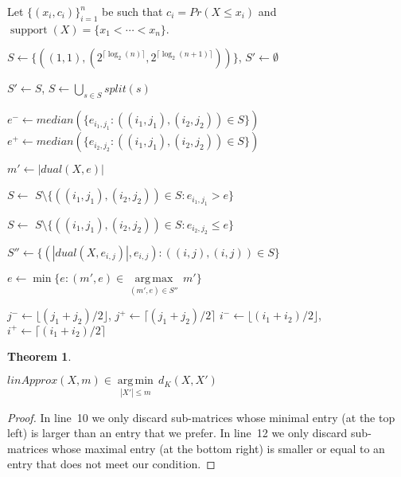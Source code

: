 \documentclass[letterpaper]{article} %
\newtheorem{theorem}[thm]{Theorem}
\DeclareMathOperator{\supp}{support}
\begin{document}
\begin{algorithm}
		\DontPrintSemicolon
		Let $\{(x_i, c_i)\}_{i=1}^n$ be such that $c_i=Pr(X \leq x_i)$ and $\supp(X)=\{x_1 < \cdots < x_n\}$.\;

		$S \gets  \{ ((1, 1),
		( 2^{\lceil \log_2(n) \rceil},2^{\lceil \log_2(n+1) \rceil})) \}$, $S' \gets \emptyset$\;
		
		
		{
			$S' \gets S$,
			$S \gets  \bigcup_{s \in S} split(s)$\;
			
			$e^- {\gets} median(\{ e_{i_1,j_1} \colon ((i_1,j_1),(i_2,j_2)) \in S \}) $\;		
			$e^+ {\gets} median(\{ e_{i_2,j_2} \colon ((i_1,j_1),(i_2,j_2)) \in S \}) $\;			

			 {
				$m' \gets |dual(X,e)|$\;
	
				 {
					$S \gets$ $S \setminus \{ ((i_1,j_1),(i_2,j_2)) \in S \colon e_{i_1,j_1} > e \}$ \;
				}
			
				\Else %
				{
					$S \gets$ $S \setminus \{ ((i_1,j_1),(i_2,j_2)) \in S \colon e_{i_2,j_2} \leq e \}$ \;
				}
			}
		}
	
		$S'' \gets \{(|dual(X,e_{i,j})|,e_{i,j}) \colon ((i,j),(i,j)) \in S\}$\;	
	
		$e \gets \min\{e\colon (m',e) \in \underset{(m',e)\in S''}{\operatorname{arg\,max}}\, m'\}$\;

		\caption{$linApprox(X,m)$}   
		\label{alg:linear}
	\end{algorithm}
{
	\begin{function}
		\DontPrintSemicolon
		
		$j^- \gets \lfloor (j_1+j_2)/2 \rfloor$,
		$j^+ \gets \lceil (j_1+j_2)/2 \rceil$\;
		$i^- \gets \lfloor (i_1+i_2)/2 \rfloor$,
		$i^+ \gets \lceil (i_1+i_2)/2 \rceil$\;

		
		\caption{{$split(((i_1,j_1),(i_2,j_2)))$}()}
		\label{proc:split}
	\end{function}
}	
	
	
\begin{theorem}\label{the:correctnessLinear}
	   
   $linApprox(X,m) {\in} \underset{|X'|\leq m}{\operatorname{arg\,min}}\, d_K(X,X')$
   
\end{theorem}
\begin{proof}
In line~10 we only discard sub-matrices whose minimal entry (at the top left) is larger than an entry that we prefer. In line~12 we only discard sub-matrices whose maximal entry (at the bottom right) is smaller or equal to an entry that does not meet our condition.
\end{proof}
\end{document}
